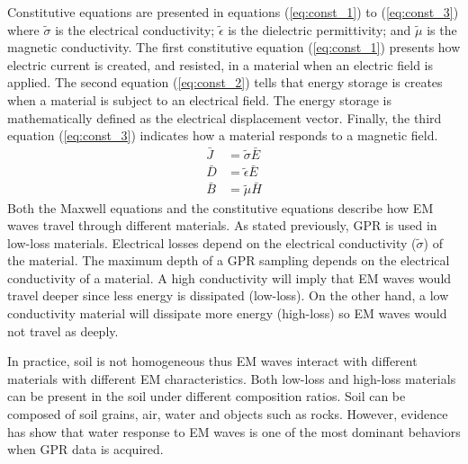 \documentclass{article}
\begin{document}
Constitutive equations are presented in equations (\ref{eq:const_1}) to (\ref{eq:const_3}) where $\tilde{\sigma}$ is the electrical conductivity; $\tilde{\epsilon}$ is the dielectric permittivity; and $\tilde{\mu}$ is the magnetic conductivity. The first constitutive equation (\ref{eq:const_1}) presents how electric current is created, and resisted, in a material when an electric field is applied. The second equation (\ref{eq:const_2}) tells that energy storage is creates when a material is subject to an electrical field. The energy storage is mathematically defined as the electrical displacement vector. Finally, the third equation (\ref{eq:const_3}) indicates how a material responds to a magnetic field. 
\begin{align}
    \bar{J} &= \tilde{\sigma} \bar{E} \label{eq:const_1} \\
    \bar{D} &= \tilde{\epsilon} \bar{E} \label{eq:const_2} \\
    \bar{B} &= \tilde{\mu} \bar{H} \label{eq:const_3}
\end{align}
Both the Maxwell equations and the constitutive equations describe how EM waves travel through different materials. As stated previously, GPR is used in low-loss materials. Electrical losses depend on the electrical conductivity ($\tilde{\sigma}$) of the material. The maximum depth of a GPR sampling depends on the electrical conductivity of a material. A high conductivity will imply that EM waves would travel deeper since less energy is dissipated (low-loss). On the other hand, a low conductivity material will dissipate more energy (high-loss) so EM waves would not travel as deeply. 

In practice, soil is not homogeneous thus EM waves interact with different materials with different EM characteristics. Both low-loss and high-loss materials can be present in the soil under different composition ratios. Soil can be composed of soil grains, air, water and objects such as rocks. However, evidence has show that water response to EM waves is one of the most dominant behaviors when GPR data is acquired.
\end{document}
